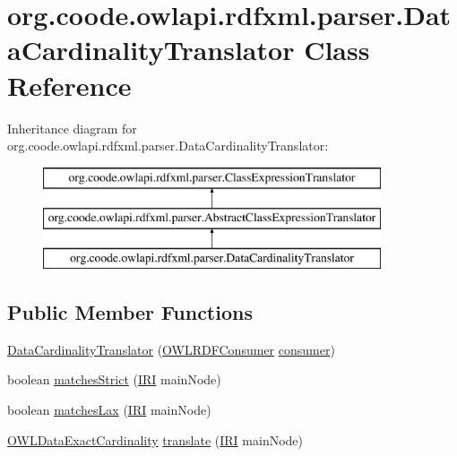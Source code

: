 \hypertarget{classorg_1_1coode_1_1owlapi_1_1rdfxml_1_1parser_1_1_data_cardinality_translator}{\section{org.\-coode.\-owlapi.\-rdfxml.\-parser.\-Data\-Cardinality\-Translator Class Reference}
\label{classorg_1_1coode_1_1owlapi_1_1rdfxml_1_1parser_1_1_data_cardinality_translator}
}
Inheritance diagram for org.\-coode.\-owlapi.\-rdfxml.\-parser.\-Data\-Cardinality\-Translator\-:\begin{figure}[H]
\begin{center}
\leavevmode
\includegraphics[height=3.000000cm]{classorg_1_1coode_1_1owlapi_1_1rdfxml_1_1parser_1_1_data_cardinality_translator}
\end{center}
\end{figure}
\subsection*{Public Member Functions}
\begin{DoxyCompactItemize}
\item 
\hyperlink{classorg_1_1coode_1_1owlapi_1_1rdfxml_1_1parser_1_1_data_cardinality_translator_a63d6e8f4d9d9c8359f8eb474c74643e6}{Data\-Cardinality\-Translator} (\hyperlink{classorg_1_1coode_1_1owlapi_1_1rdfxml_1_1parser_1_1_o_w_l_r_d_f_consumer}{O\-W\-L\-R\-D\-F\-Consumer} \hyperlink{classorg_1_1coode_1_1owlapi_1_1rdfxml_1_1parser_1_1_abstract_class_expression_translator_ae547084cdd5b92c03835b5aa404f823b}{consumer})
\item 
boolean \hyperlink{classorg_1_1coode_1_1owlapi_1_1rdfxml_1_1parser_1_1_data_cardinality_translator_a908794fcc42905fddb4b6988c784f071}{matches\-Strict} (\hyperlink{classorg_1_1semanticweb_1_1owlapi_1_1model_1_1_i_r_i}{I\-R\-I} main\-Node)
\item 
boolean \hyperlink{classorg_1_1coode_1_1owlapi_1_1rdfxml_1_1parser_1_1_data_cardinality_translator_a88e080300cfffda615a55f5436432b58}{matches\-Lax} (\hyperlink{classorg_1_1semanticweb_1_1owlapi_1_1model_1_1_i_r_i}{I\-R\-I} main\-Node)
\item 
\hyperlink{interfaceorg_1_1semanticweb_1_1owlapi_1_1model_1_1_o_w_l_data_exact_cardinality}{O\-W\-L\-Data\-Exact\-Cardinality} \hyperlink{classorg_1_1coode_1_1owlapi_1_1rdfxml_1_1parser_1_1_data_cardinality_translator_af6f4d85fc1a766875d6c50772b0af812}{translate} (\hyperlink{classorg_1_1semanticweb_1_1owlapi_1_1model_1_1_i_r_i}{I\-R\-I} main\-Node)
\end{DoxyCompactItemize}
